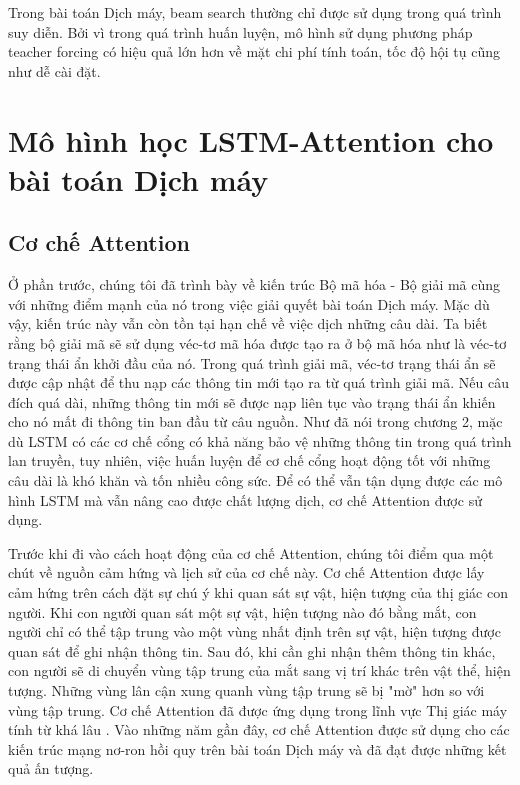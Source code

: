 Trong bài toán Dịch máy, beam search thường chỉ được sử dụng trong quá trình suy diễn. Bởi vì trong quá trình huấn luyện, mô hình sử dụng phương pháp teacher forcing có hiệu quả lớn hơn về mặt chi phí tính toán, tốc độ hội tụ cũng như dễ cài đặt.
\section{Mô hình học LSTM-Attention cho bài toán Dịch máy}
\subsection{Cơ chế Attention}
Ở phần trước, chúng tôi đã trình bày về kiến trúc Bộ mã hóa - Bộ giải mã cùng với những điểm mạnh của nó trong việc giải quyết bài toán Dịch máy. Mặc dù vậy, kiến trúc này vẫn còn tồn tại hạn chế về việc dịch những câu dài. Ta biết rằng bộ giải mã sẽ sử dụng véc-tơ mã hóa được tạo ra ở bộ mã hóa như là véc-tơ trạng thái ẩn khởi đầu của nó. Trong quá trình giải mã, véc-tơ trạng thái ẩn sẽ được cập nhật để thu nạp các thông tin mới tạo ra từ quá trình giải mã. Nếu câu đích quá dài, những thông tin mới sẽ được nạp liên tục vào trạng thái ẩn khiến cho nó mất đi thông tin ban đầu từ câu nguồn.  Như đã nói trong chương 2, mặc dù LSTM có các cơ chế cổng có khả năng bảo vệ những thông tin trong quá trình lan truyền, tuy nhiên, việc huấn luyện để cơ chế cổng hoạt động tốt với những câu dài là khó khăn và tốn nhiều công sức. Để có thể vẫn tận dụng được các mô hình LSTM mà vẫn nâng cao được chất lượng dịch, cơ chế Attention được sử dụng.

Trước khi đi vào cách hoạt động của cơ chế Attention, chúng tôi điểm qua một chút về nguồn cảm hứng và lịch sử của cơ chế này. Cơ chế Attention được lấy cảm hứng trên cách đặt sự chú ý khi quan sát sự vật, hiện tượng của thị giác con người. Khi con người quan sát một sự vật, hiện tượng nào đó bằng mắt, con người chỉ có thể tập trung vào một vùng nhất định trên sự vật, hiện tượng được quan sát để ghi nhận thông tin. Sau đó, khi cần ghi nhận thêm thông tin khác, con người sẽ di chuyển vùng tập trung của mắt sang vị trí khác trên vật thể, hiện tượng. Những vùng lân cận xung quanh vùng tập trung sẽ bị "mờ" hơn so với vùng tập trung. Cơ chế Attention đã được ứng dụng trong lĩnh vực Thị giác máy tính từ khá lâu \cite{attentionhistory2010} \cite{attentionhistory2011}. Vào những năm gần đây, cơ chế Attention được sử dụng cho các kiến trúc mạng nơ-ron hồi quy trên bài toán Dịch máy và đã đạt được những kết quả ấn tượng.

